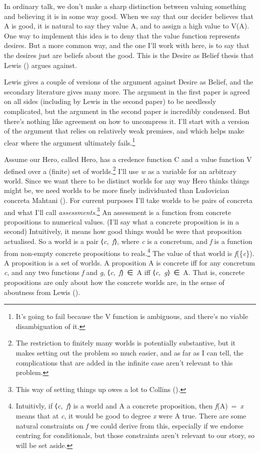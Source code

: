\documentclass[
  11pt,
  letterpaper,
  DIV=11,
  numbers=noendperiod,
  twoside]{scrartcl}
\begin{document}
In ordinary talk, we don't make a sharp distinction between valuing
something and believing it is in some way good. When we say that our
decider believes that A is good, it is natural to say they value A, and
to assign a high value to V(A). One way to implement this idea is to
deny that the value function represents desires. But a more common way,
and the one I'll work with here, is to say that the desires just are
beliefs about the good. This is the Desire as Belief thesis that Lewis
() argues against.

Lewis gives a couple of versions of the argument against Desire as
Belief, and the secondary literature gives many more. The argument in
the first paper is agreed on all sides (including by Lewis in the second
paper) to be needlessly complicated, but the argument in the second
paper is incredibly condensed. But there's nothing like agreement on how
to uncompress it. I'll start with a version of the argument that relies
on relatively weak premises, and which helps make clear where the
argument ultimately fails.\footnote{It's going to fail because the V
  function is ambiguous, and there's no viable disambiguation of it.}

Assume our Hero, called Hero, has a credence function C and a value
function V defined over a (finite) set of worlds.\footnote{The
  restriction to finitely many worlds is potentially substantive, but it
  makes setting out the problem so much easier, and as far as I can
  tell, the complications that are added in the infinite case aren't
  relevant to this problem.} I'll use \emph{w} as a variable for an
arbitrary world. Since we want there to be distinct worlds for any way
Hero thinks things might be, we need worlds to be more finely
individuated than Ludovician concreta Mahtani
(). For current purposes I'll take
worlds to be pairs of concreta and what I'll call
\emph{assessments}.\footnote{This way of setting things up owes a lot to
  Collins ().} An assessment is a
function from concrete propositions to numerical values. (I'll say what
a concrete proposition is in a second) Intuitively, it means how good
things would be were that proposition actualised. So a world is a pair
⟨\emph{c},~\emph{f}⟩, where \emph{c} is a concretum, and \emph{f} is a
function from non-empty concrete propositions to reals.\footnote{Intuitivly,
  if ⟨\emph{c},~\emph{f}⟩ is a world and A a concrete proposition, then
  \emph{f}(A)~=~\emph{x} means that at \emph{c}, it would be good to
  degree \emph{x} were A true. There are some natural constraints on
  \emph{f} we could derive from this, especially if we endorse centring
  for conditionals, but those constraints aren't relevant to our story,
  so will be set aside.} The value of that world is
\emph{f}(\{\emph{c}\}). A proposition is a set of worlds. A proposition
A is concrete iff for any concretum \emph{c}, and any two functions
\emph{f} and \emph{g}, ⟨\emph{c},~\emph{f}⟩~∈~A iff
⟨\emph{c},~\emph{g}⟩~∈~A. That is, concrete propositions are only about
how the concrete worlds are, in the sense of aboutness from Lewis
().
\end{document}
